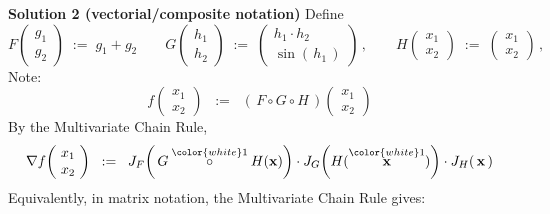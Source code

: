 \vskip 0.5cm
\noindent
\textbf{Solution 2 (vectorial/composite notation)}
\vskip 0.2cm
\noindent
Define
\begin{equation*}
F\!\left(\!\begin{array}{c} g_{1} \\ g_{2} \end{array}\!\right)
\; := \;
	g_{1} + g_{2}
\quad\quad
G\!\left(\!\begin{array}{c} h_{1} \\ h_{2} \end{array}\!\right)
\; := \;
	\left(\!\begin{array}{c} h_{1} \cdot h_{2} \\ \sin(\,h_{1}\,) \end{array}\!\right)\,,
\quad\quad
H\!\left(\!\begin{array}{c} x_{1} \\ x_{2} \end{array}\!\right)
\; := \;
	\left(\!\begin{array}{c} x_{1} \\ x_{2} \end{array}\!\right)\,,
\end{equation*}
Note:
\begin{equation*}
f\!\left(\!\begin{array}{c} x_{1} \\ x_{2} \end{array}\!\right)
\;\; := \;\;
	(\,F \circ G \circ H\,)\!\left(\!\begin{array}{c} x_{1} \\ x_{2} \end{array}\!\right)
\end{equation*}
By the Multivariate Chain Rule,
\begin{equation*}
\nabla f\!\left(\!\begin{array}{c} x_{1} \\ x_{2} \end{array}\!\right)
\;\; := \;\;
	J_{F}\!\left(\,G \overset{{\color{white}1}}{\circ} H(\mathbf{x})\right)
	\cdot
	J_{G}\!\left(H(\overset{{\color{white}1}}{\mathbf{x}})\right)
	\cdot
	J_{H}(\,\mathbf{x}\,)
\end{equation*}
Equivalently, in matrix notation, the Multivariate Chain Rule gives:
